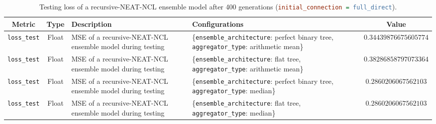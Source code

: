 \begin{table}[H]
    \centering
    \begin{tabular}{|c|c|p{4cm}|p{5cm}|c|}
        \hline
        Metric & Type & Description & Configurations & Value \\
        \hline
        \small\texttt{loss\_test} & Float & MSE of a recursive-NEAT-NCL ensemble model during testing & \{\texttt{ensemble\_architecture}: perfect binary tree, \texttt{aggregator\_type}: arithmetic mean\} & $0.34439876675605774$ \\
        \hline
        \small\texttt{loss\_test} & Float & MSE of a recursive-NEAT-NCL ensemble model during testing & \{\texttt{ensemble\_architecture}: flat tree, \texttt{aggregator\_type}: arithmetic mean\} & $0.38286858797073364$ \\
        \hline
        \small\texttt{loss\_test} & Float & MSE of a recursive-NEAT-NCL ensemble model during testing & \{\texttt{ensemble\_architecture}: perfect binary tree, \texttt{aggregator\_type}: median\} & $0.2860206067562103$ \\
        \hline
        \small\texttt{loss\_test} & Float & MSE of a recursive-NEAT-NCL ensemble model during testing & \{\texttt{ensemble\_architecture}: flat tree, \texttt{aggregator\_type}: median\} & $0.2860206067562103$ \\
        \hline
    \end{tabular}
    \caption{Testing loss of a recursive-NEAT-NCL ensemble model after 400 generations (\lstinline[language=ini]|initial_connection = full_direct|). }
    \label{table:experiment_6_neat_ncl_full_direct}
\end{table}